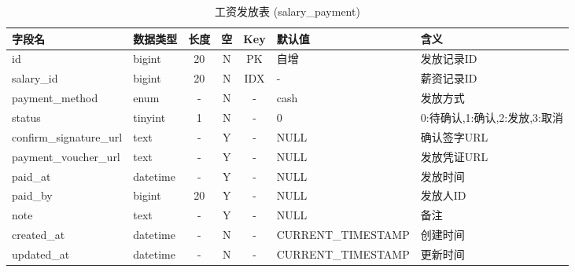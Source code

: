 \documentclass[UTF8,a4paper,12pt]{article}
\begin{document}
\begin{table}[H]
    \centering
    \caption{工资发放表 (salary\_payment)}
    \label{tab:salary_payment}
    \small
    \renewcommand{\arraystretch}{1.3}
    \begin{tabular}{|l|l|c|c|c|l|l|}
        \hline
        \rowcolor{gray!15} \textbf{字段名} & \textbf{数据类型} & \textbf{长度} & \textbf{空} & \textbf{Key} & \textbf{默认值} & \textbf{含义} \\ \hline
        id & bigint & 20 & N & PK & 自增 & 发放记录ID \\ \hline
        salary\_id & bigint & 20 & N & IDX & - & 薪资记录ID \\ \hline
        payment\_method & enum & - & N & - & cash & 发放方式 \\ \hline
        status & tinyint & 1 & N & - & 0 & 0:待确认,1:确认,2:发放,3:取消 \\ \hline
        confirm\_signature\_url & text & - & Y & - & NULL & 确认签字URL \\ \hline
        payment\_voucher\_url & text & - & Y & - & NULL & 发放凭证URL \\ \hline
        paid\_at & datetime & - & Y & - & NULL & 发放时间 \\ \hline
        paid\_by & bigint & 20 & Y & - & NULL & 发放人ID \\ \hline
        note & text & - & Y & - & NULL & 备注 \\ \hline
        created\_at & datetime & - & N & - & CURRENT\_TIMESTAMP & 创建时间 \\ \hline
        updated\_at & datetime & - & N & - & CURRENT\_TIMESTAMP & 更新时间 \\ \hline
    \end{tabular}
\end{table}
\end{document}
